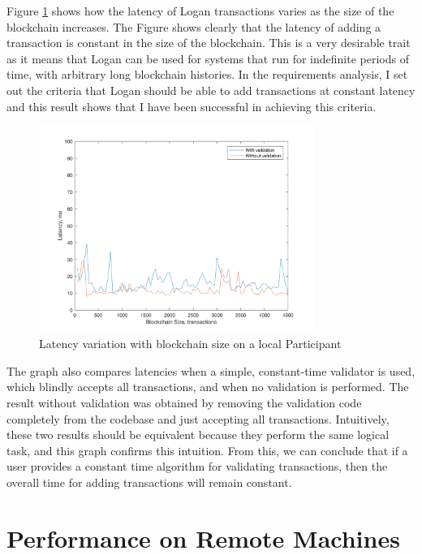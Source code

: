 \documentclass[12pt,a4paper,twoside,openright]{report}
\begin{document}
	Figure \ref{fig:locallatency} shows how the latency of Logan transactions varies as the size of the blockchain increases. 
	The Figure shows clearly that the latency of adding a transaction is constant in the size of the blockchain.
	This is a very desirable trait as it means that Logan can be used for systems that run for indefinite periods of time, with arbitrary long blockchain histories.
	In the requirements analysis, I set out the criteria that Logan should be able to add transactions at constant latency and this result shows that I have been successful in achieving this criteria.\\
	\begin{figure}
		\centering
		\includegraphics[width=0.8\textwidth]{figs/latency_vs_size.png}
		\caption{Latency variation with blockchain size on a local Participant}
		\label{fig:locallatency}
	\end{figure}

	The graph also compares latencies when a simple, constant-time validator is used, which blindly accepts all transactions, and when no validation is performed. 
	The result without validation was obtained by removing the validation code completely from the codebase and just accepting all transactions.
	Intuitively, these two results should be equivalent because they perform the same logical task, and this graph confirms this intuition. 
	From this, we can conclude that if a user provides a constant time algorithm for validating transactions, then the overall time for adding transactions will remain constant.
	

	\section{Performance on Remote Machines}
\end{document}
